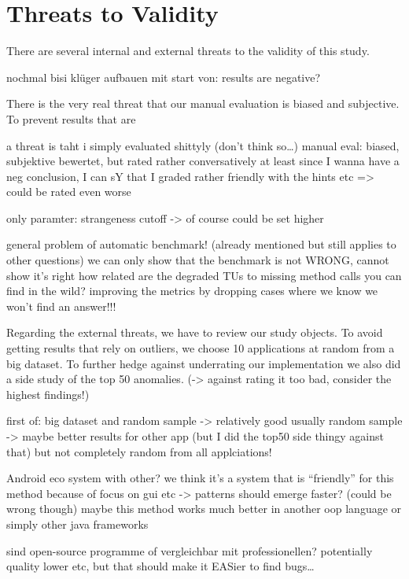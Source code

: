\section{Threats to Validity}

There are several internal and external threats to the validity of this study.

nochmal bisi klüger aufbauen mit start von: results are negative?

There is the very real threat that our manual evaluation is biased and subjective.
To prevent results that are 

a threat is taht i simply evaluated shittyly (don't think so\ldots)
manual eval: biased, subjektive bewertet, but rated rather conversatively at least
since I wanna have a neg conclusion, I can sY that I graded rather friendly with the hints etc => could be rated even worse

only paramter: strangeness cutoff -> of course could be set higher

general problem of automatic benchmark! (already mentioned but still applies to other questions)
    we can only show that the benchmark is not WRONG, cannot show it's right
how related are the degraded TUs to missing method calls you can find in the wild?
improving the metrics by dropping cases where we know we won't find an answer!!!

Regarding the external threats, we have to review our study objects.
To avoid getting results that rely on outliers, we choose 10 applications at random from a big dataset.
To further hedge against underrating our implementation we also did a side study of the top 50 anomalies. (-> against rating it too bad, consider the highest findings!)

first of: big dataset and random sample -> relatively good usually
random sample -> maybe better results for other app (but I did the top50 side thingy against that)
but not completely random from all applciations!

Android eco system with other? 
    we think it's a system that is ``friendly'' for this method because of focus on gui etc -> patterns should emerge faster? (could be wrong though)
    maybe this method works much better in another oop language or simply other java frameworks

sind open-source programme of vergleichbar mit professionellen?
potentially quality lower etc, but that should make it EASier to find bugs\ldots

